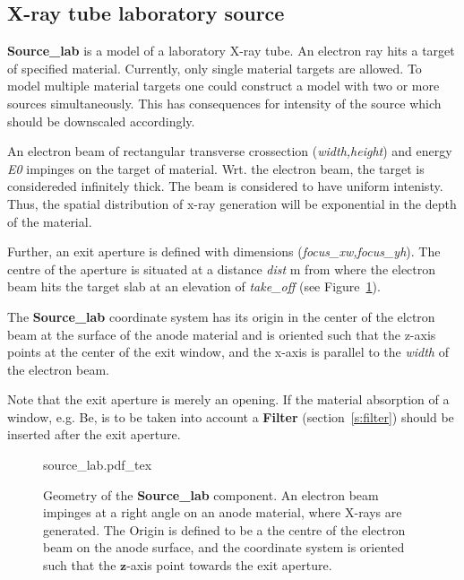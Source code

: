 \subsection*{X-ray tube laboratory source}
\label{s:source-lab}

\textbf{Source\_lab} is a model of a laboratory X-ray tube. An electron ray hits a
target of specified material. Currently, only single material targets are
allowed. To model multiple material targets one could construct a model with two
or more sources simultaneously. This has consequences for intensity of the source which should be downscaled accordingly.

An electron beam of rectangular transverse crossection (\textit{width,height}) and energy \textit{E0}
impinges on the target of material. Wrt. the electron beam, the target is
considereded infinitely thick. The beam is considered to have uniform
intenisty. Thus, the spatial distribution of x-ray generation will be
exponential in the depth of the material.

Further, an exit aperture is defined with dimensions
(\textit{focus\_xw,focus\_yh}). The centre of the aperture is situated at a
distance \textit{dist} \si{m} from where the electron beam hits the target slab
at an elevation of \textit{take\_off} (see Figure~\ref{f:source_lab}).  

The \textbf{Source\_lab} coordinate system has its origin in the center of the
elctron beam at the surface of the
anode material and is oriented such that the z-axis points at the center of the
exit window, and the x-axis is parallel to the \emph{width} of the electron
beam. 

Note that the exit aperture is merely an opening. If the
material absorption of a window, e.g. Be, is to be taken into account a
\textbf{Filter} (section~\ref{s:filter}) should be inserted after the exit
aperture. 

\begin{figure}
\label{f:source_lab}
\centering
\def\svgwidth{\columnwidth}
%
{source_lab.pdf_tex}
\caption{Geometry of the \textbf{Source\_lab} component. An electron beam impinges at a right angle on
an anode material, where X-rays are generated. The Origin is defined to be a the centre of the electron beam
on the anode surface, and the coordinate system is oriented such that the $\boldsymbol{z}$-axis point towards
the exit aperture.} 
\end{figure}

